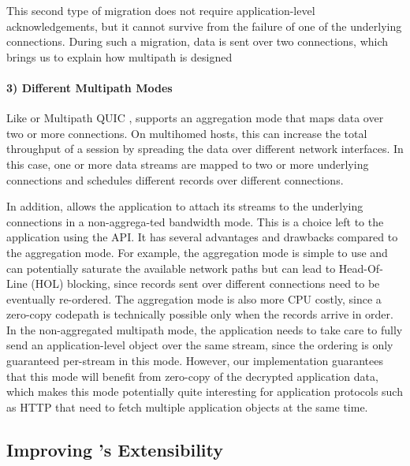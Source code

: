 This second type of migration does not require application-level
acknowledgements, but it cannot survive from the failure of one of the
underlying connections. During such a migration, data is sent over two
connections, which brings us to explain how multipath is designed

\paragraph*{3) Different Multipath Modes}
Like \mptcp \cite{raiciu2012hard,rfc6824} or Multipath QUIC \cite{de2017multipath,draft-liu-multipath-quic-02}, \tcpls supports an aggregation mode that maps data over two or more \tcp connections. On multihomed hosts, this can increase the total throughput of a \tcpls session by spreading the data over different network interfaces. In this case, one or more data streams are mapped to two or more underlying \tcp connections and \tcpls schedules different records over different connections.

In addition, \tcpls allows the application to attach its streams to the
underlying \tcp connections in a non-aggrega-ted bandwidth mode. This is a choice left to the application using the API. It has several advantages and drawbacks compared to the aggregation mode. For example, the aggregation mode is simple to use and can potentially saturate the available network paths but can lead to Head-Of-Line (HOL) blocking, since records sent over different \tcp connections need to be eventually re-ordered. The aggregation mode is also more CPU costly, since a zero-copy codepath is technically possible only when the records arrive in order. In the non-aggregated multipath mode, the application needs to take care to fully send an application-level object over the same stream, since the ordering is only guaranteed per-stream in this mode. However, our \tcpls implementation guarantees that this mode will benefit from zero-copy of the decrypted application data, which makes this mode potentially quite interesting for application protocols such as HTTP that need to fetch multiple application objects at the same time.

\subsection{Improving \tcp's Extensibility}

